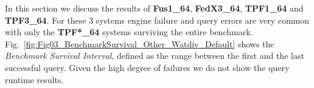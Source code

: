 %
%
%
%

In this section we discuss the results of \textbf{Fus1\_64}, \textbf{FedX3\_64}, \textbf{TPF1\_64} and \textbf{TPF3\_64}. 
For these 3 systems engine failure and query errors are very common with only the \textbf{TPF*\_64} systems surviving the entire benchmark.
Fig.~\ref{fig:Fig03_BenchmarkSurvival_Other_Watdiv_Default} shows the \emph{Benchmark Survival Interval}, defined as the range between the first and the last successful query. 
Given the high degree of failures we do not show the query runtime results.



